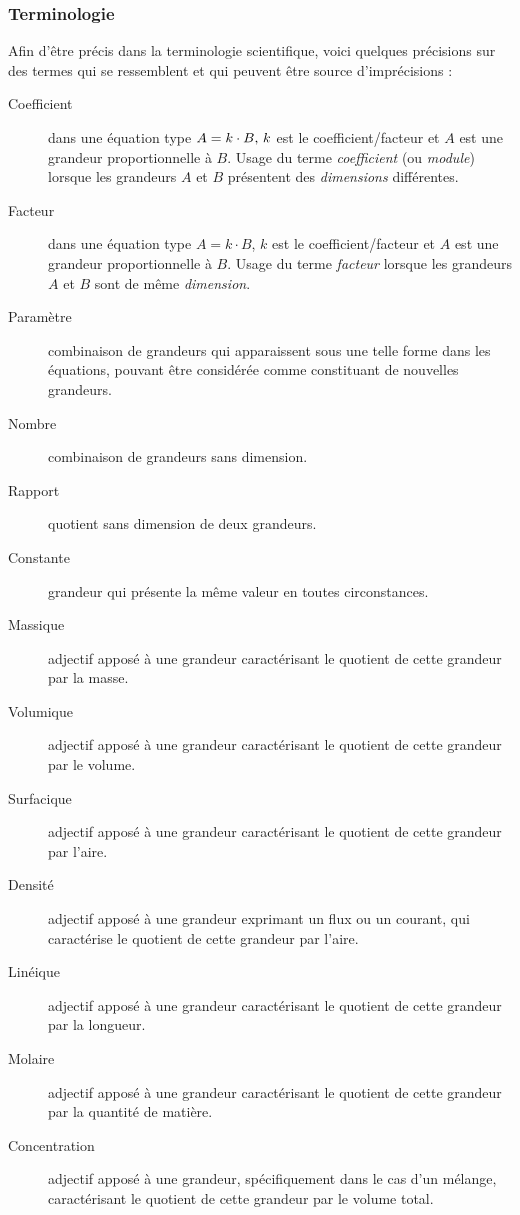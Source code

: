 \documentclass[a4paper, 11pt, twoside, fleqn]{memoir}
\begin{document}
\subsubsection{Terminologie}

Afin d'être précis dans la terminologie scientifique, voici quelques précisions sur des termes qui se ressemblent et qui peuvent être source d'imprécisions :

\begin{description}
\item[Coefficient] dans une équation type \(A=k \cdot B$, $k\) est le coefficient/facteur et \(A\) est une grandeur proportionnelle à \(B\). Usage du terme \emph{coefficient} (ou \emph{module}) lorsque les grandeurs \(A\) et \(B\) présentent des \emph{dimensions} différentes.
\item[Facteur] dans une équation type \(A=k \cdot B\), \(k\) est le coefficient/facteur et \(A\) est une grandeur proportionnelle à \(B\). Usage du terme \emph{facteur} lorsque les grandeurs \(A\) et \(B\) sont de même \emph{dimension}.
\item[Paramètre] combinaison de grandeurs qui apparaissent sous une telle forme dans les équations, pouvant être considérée comme constituant de nouvelles grandeurs.
\item[Nombre] combinaison de grandeurs sans dimension.
\item[Rapport] quotient sans dimension de deux grandeurs.
\item[Constante] grandeur qui présente la même valeur en toutes circonstances.
\item[Massique] adjectif apposé à une grandeur caractérisant le quotient de cette grandeur par la masse.
\item[Volumique] adjectif apposé à une grandeur caractérisant le quotient de cette grandeur par le volume.
\item[Surfacique] adjectif apposé à une grandeur caractérisant le quotient de cette grandeur par l'aire.
\item[Densité] adjectif apposé à une grandeur exprimant un flux ou un courant, qui caractérise le quotient de cette grandeur par l'aire.
\item[Linéique] adjectif apposé à une grandeur caractérisant le quotient de cette grandeur par la longueur.
\item[Molaire] adjectif apposé à une grandeur caractérisant le quotient de cette grandeur par la quantité de matière.
\item[Concentration] adjectif apposé à une grandeur, spécifiquement dans le cas d'un mélange, caractérisant le quotient de cette grandeur par le volume total.
\end{description}
\end{document}
